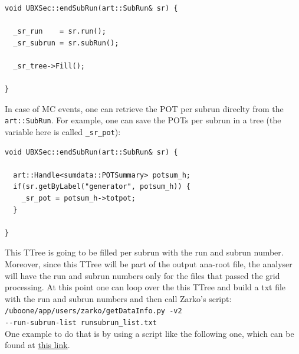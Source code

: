 \documentclass[a4paper, oneside, 12pt, onecolumn]{article}
\begin{document}
\begin{mdframed}[style=exampledefault]%
\begin{lstlisting}[label=some-code]
void UBXSec::endSubRun(art::SubRun& sr) {

  _sr_run    = sr.run();
  _sr_subrun = sr.subRun();
  
  _sr_tree->Fill();

}
\end{lstlisting}
\end{mdframed} 

In case of MC events, one can retrieve the POT per subrun direclty from the \texttt{art::SubRun}. For example, one can save the POTs per subrun in a tree (the variable here is called \texttt{\_sr\_pot}):

\begin{mdframed}[style=exampledefault]%
\begin{lstlisting}[label=some-code]
void UBXSec::endSubRun(art::SubRun& sr) {

  art::Handle<sumdata::POTSummary> potsum_h;
  if(sr.getByLabel("generator", potsum_h)) {
    _sr_pot = potsum_h->totpot;
  }

}
\end{lstlisting}
\end{mdframed}

This TTree is going to be filled per subrun with the run and subrun number. Moreover, since this TTree will be part of the output ana-root file, the analyser will have the run and subrun numbers only for the files that passed the grid processing.
At this point one can loop over the this TTree and build a txt file with the run and subrun numbers and then call Zarko's script:\\

\texttt{/uboone/app/users/zarko/getDataInfo.py -v2 \\ -\/-run-subrun-list runsubrun\_list.txt}\\

One example to do that is by using a script like the following one, which can be found at \href{https://github.com/marcodeltutto/UBXSec/blob/master/Utils/countPOT.py}{this link}.
\end{document}
